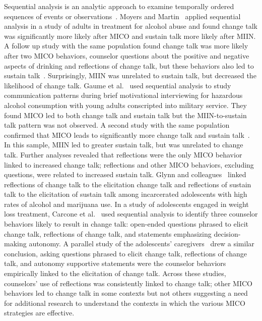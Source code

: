 Sequential analysis is an analytic approach to examine temporally ordered sequences of events or observations~\cite{bakeman1997observing, bakeman2011sequential}. Moyers and Martin~\cite{moyers2006therapist} applied sequential analysis in a study of adults in treatment for alcohol abuse and found change talk was significantly more likely after MICO and sustain talk more likely after MIIN. A follow up study with the same population found change talk was more likely after two MICO behaviors, counselor questions about the positive and negative aspects of drinking and reflections of change talk, but these behaviors also led to sustain talk~\cite{moyers2009session}. Surprisingly, MIIN was unrelated to sustain talk, but decreased the likelihood of change talk. Gaume et al.~\cite{gaume2008counsellor} used sequential analysis to study communication patterns during brief motivational interviewing for hazardous alcohol consumption with young adults conscripted into military service. They found MICO led to both change talk and sustain talk but the MIIN-to-sustain talk pattern was not observed. A second study with the same population confirmed that MICO leads to significantly more change talk and sustain talk~\cite{gaume2010counselor}. In this sample, MIIN led to greater sustain talk, but was unrelated to change talk. Further analyses revealed that reflections were the only MICO behavior linked to increased change talk; reflections and other MICO behaviors, excluding questions, were related to increased sustain talk. Glynn and colleagues~\cite{glynn2014change} linked reflections of change talk to the elicitation change talk and reflections of sustain talk to the elicitation of sustain talk among incarcerated adolescents with high rates of alcohol and marijuana use. In a study of adolescents engaged in weight loss treatment, Carcone et al.~\cite{carcone2013provider} used sequential analysis to identify three counselor behaviors likely to result in change talk: open-ended questions phrased to elicit change talk, reflections of change talk, and statements emphasizing decision-making autonomy. A parallel study of the adolescents' caregivers~\cite{jacques2016building} drew a similar conclusion, asking questions phrased to elicit change talk, reflections of change talk, and autonomy supportive statements were the counselor behaviors empirically linked to the elicitation of change talk. Across these studies, counselors' use of reflections was consistently linked to change talk; other MICO behaviors led to change talk in some contexts but not others suggesting a need for additional research to understand the contexts in which the various MICO strategies are effective. 

